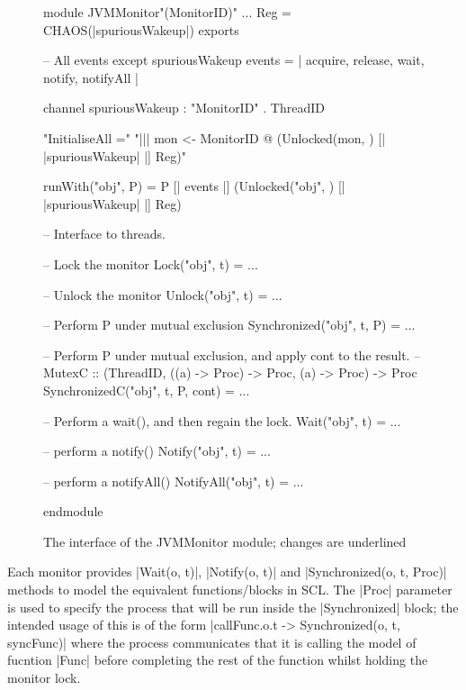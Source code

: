 \begin{figure}[H]
\begin{cspm}
module JVMMonitor"(MonitorID)"
    ...
    Reg = CHAOS({|spuriousWakeup|})
exports

    -- All events except spuriousWakeup
    events = {| acquire, release, wait, notify, notifyAll |}

    channel spuriousWakeup : "MonitorID" . ThreadID
  
    "InitialiseAll ="
      "||| mon <- MonitorID @ (Unlocked(mon, {})  [| {|spuriousWakeup|} |] Reg)"

    runWith("obj", P) = P [| events |] (Unlocked("obj", {})  [| {|spuriousWakeup|} |] Reg)

    -- Interface to threads.

    -- Lock the monitor
    Lock("obj", t) = ...

    -- Unlock the monitor
    Unlock("obj", t) = ...

    -- Perform P under mutual exclusion
    Synchronized("obj", t, P) = ...

    -- Perform P under mutual exclusion, and apply cont to the result. 
    -- MutexC :: (ThreadID, ((a) -> Proc) -> Proc, (a) -> Proc) -> Proc
    SynchronizedC("obj", t, P, cont) = ...

    -- Perform a wait(), and then regain the lock.
    Wait("obj", t) = ... 

    -- perform a notify()
    Notify("obj", t) = ...

    -- perform a notifyAll()
    NotifyAll("obj", t) = ...

endmodule
\end{cspm}
\caption{The interface of the JVMMonitor module; changes are underlined}
\end{figure}

Each monitor provides |Wait(o, t)|, |Notify(o, t)| and |Synchronized(o, t, Proc)| methods to model the equivalent functions/blocks in SCL. The |Proc| parameter is used to specify the process that will be run inside the |Synchronized| block; the intended usage of this is of the form |callFunc.o.t -> Synchronized(o, t, syncFunc)| where the process communicates that it is calling the model of fucntion |Func| before completing the rest of the function whilst holding the monitor lock.


% 


